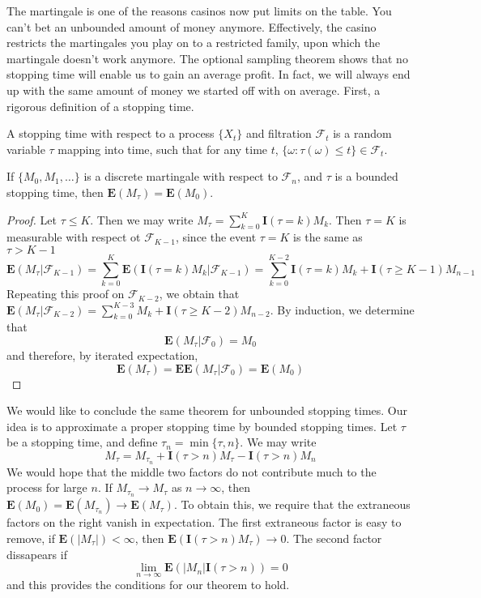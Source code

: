 The martingale is one of the reasons casinos now put limits on the table. You can't bet an unbounded amount of money anymore. Effectively, the casino restricts the martingales you play on to a restricted family, upon which the martingale doesn't work anymore. The optional sampling theorem shows that no stopping time will enable us to gain an average profit. In fact, we will always end up with the same amount of money we started off with on average. First, a rigorous definition of a stopping time.

\begin{definition}
    A stopping time with respect to a process $\{ X_t \}$ and filtration $\mathcal{F}_t$ is a random variable $\tau$ mapping into time, such that for any time $t$, $\{ \omega : \tau(\omega) \leq t \} \in \mathcal{F}_t$.
\end{definition}

\begin{lemma}
    If $\{ M_0, M_1, \dots \}$ is a discrete martingale with respect to $\mathcal{F}_n$, and $\tau$ is a bounded stopping time, then $\mathbf{E}(M_\tau) = \mathbf{E}(M_0)$.
\end{lemma}
\begin{proof}
    Let $\tau \leq K$. Then we may write $M_{\tau} = \sum_{k = 0}^K \mathbf{I}(\tau = k) M_k$. Then $\tau = K$ is measurable with respect ot $\mathcal{F}_{K-1}$, since the event $\tau = K$ is the same as $\tau > K-1$
    \[ \mathbf{E}(M_\tau | \mathcal{F}_{K-1}) = \sum_{k = 0}^K \mathbf{E} (\mathbf{I}(\tau = k) M_k | \mathcal{F}_{K-1}) = \sum_{k = 0}^{K-2} \mathbf{I}(\tau = k) M_k + \mathbf{I}(\tau \geq K-1) M_{n-1} \]
    Repeating this proof on $\mathcal{F}_{K-2}$, we obtain that $\mathbf{E}(M_\tau | \mathcal{F}_{K-2}) = \sum_{k = 0}^{K-3} M_k + \mathbf{I}(\tau \geq K - 2) M_{n-2}$. By induction, we determine that 
    \[ \mathbf{E}(M_\tau | \mathcal{F}_0) = M_0 \]
    and therefore, by iterated expectation,
    \[ \mathbf{E}(M_\tau) = \mathbf{E}\mathbf{E}(M_\tau | \mathcal{F}_0) = \mathbf{E}(M_0) \]
\end{proof}

We would like to conclude the same theorem for unbounded stopping times. Our idea is to approximate a proper stopping time by bounded stopping times. Let $\tau$ be a stopping time, and define $\tau_n = \min \{ \tau, n \}$. We may write
%
\[ M_\tau = M_{\tau_n} + \mathbf{I}(\tau > n) M_\tau - \mathbf{I}(\tau > n) M_n \]
%
We would hope that the middle two factors do not contribute much to the process for large $n$. If $M_{\tau_n} \to M_\tau$ as $n \to \infty$, then $\mathbf{E}(M_0) = \mathbf{E}(M_{\tau_n}) \to \mathbf{E}(M_\tau)$. To obtain this, we require that the extraneous factors on the right vanish in expectation. The first extraneous factor is easy to remove, if $\mathbf{E}(|M_\tau|) < \infty$, then $\mathbf{E}(\mathbf{I}(\tau > n) M_\tau) \to 0$. The second factor dissapears if
%
\[ \lim_{n \to \infty} \mathbf{E}(|M_n| \mathbf{I}(\tau > n)) = 0 \]
%
and this provides the conditions for our theorem to hold.

